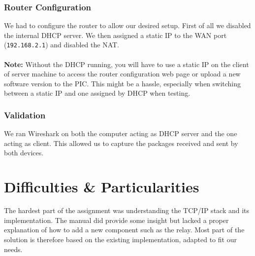 \documentclass[11pt]{article}
\begin{document}
\subsubsection{Router Configuration}
We had to configure the router to allow our desired setup. First of all we
disabled the internal DHCP server. We then assigned a static IP to the WAN port
(\texttt{192.168.2.1}) and disabled the NAT. \\
\\
\textbf{Note:} Without the DHCP running, you will have to use a static IP on the
client of server machine to access the router configuration web page or upload a
new software version to the PIC. This might be a hassle, especially when
switching between a static IP and one assigned by DHCP when testing.

\subsubsection{Validation}
We ran Wireshark on both the computer acting as DHCP server and the one acting
as client. This allowed us to capture the packages received and sent by both
devices.

\section{Difficulties \& Particularities}
The hardest part of the assignment was understanding the TCP/IP stack and its
implementation. The manual did provide some insight but lacked a proper
explanation of how to add a new component such as the relay. Most part of the
solution is therefore based on the existing implementation, adapted to fit our
needs.
\end{document}
